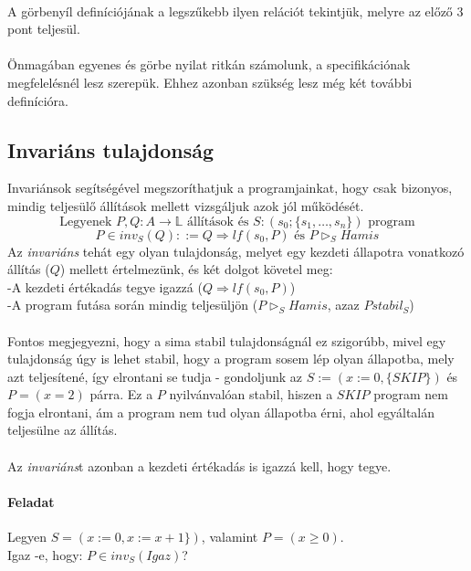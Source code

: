 \documentclass[12pt]{article}
\begin{document}
	\paragraph{}
	A görbenyíl definíciójának a legszűkebb ilyen relációt tekintjük, melyre az előző 3 pont teljesül.
	\paragraph{} Önmagában egyenes és görbe nyilat ritkán számolunk, a specifikációnak megfelelésnél lesz szerepük. Ehhez azonban szükség lesz még két további definícióra.
	\subsection{Invariáns tulajdonság}
	Invariánsok segítségével megszoríthatjuk a programjainkat, hogy csak bizonyos, mindig teljesülő állítások mellett vizsgáljuk azok jól működését.
	$$\text{Legyenek }P,Q: A \rightarrow \mathbb{L} \text{ állítások és }S: (s_0; \{s_1, \dots, s_n\})\text{ program}$$
	$$P \in inv_S(Q) ::= Q \Rightarrow lf(s_0, P) \text{ és } P\vartriangleright_S Hamis$$
	Az \textit{invariáns} tehát egy olyan tulajdonság, melyet egy kezdeti állapotra vonatkozó állítás ($Q$) mellett értelmezünk, és két dolgot követel meg:\\
	-A kezdeti értékadás tegye igazzá ($Q\Rightarrow lf(s_0, P)$)\\
	-A program futása során mindig teljesüljön ($P \vartriangleright_S Hamis$, azaz $P stabil_S$)
	\paragraph{}
	Fontos megjegyezni, hogy a sima stabil tulajdonságnál ez szigorúbb, mivel egy tulajdonság úgy is lehet stabil, hogy a program sosem lép olyan állapotba, mely azt teljesítené, így elrontani se tudja - gondoljunk az $S := (x:=0, \{SKIP\})$ és $P=(x=2)$ párra. Ez a $P$ nyilvánvalóan stabil, hiszen a $SKIP$ program nem fogja elrontani, ám a program nem tud olyan állapotba érni, ahol egyáltalán teljesülne az állítás.
	\paragraph{}Az \textit{invariáns}t azonban a kezdeti értékadás is igazzá kell, hogy tegye.
	
	\paragraph{Feladat}
	Legyen $ S = (x:=0,x := x+1 \})$, valamint $P = (x\ge0)$.\\
	Igaz -e, hogy: $P \in inv_S(Igaz)$?
\end{document}
